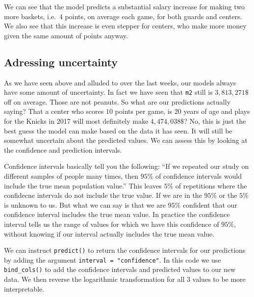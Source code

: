 \documentclass[
]{book}
\begin{document}
We can see that the model predicts a substantial salary increase for making two
more baskets, i.e.~4 points, on average each game, for both guards and centers.
We also see that this increase is even stepper for centers, who make more money
given the same amount of points anyway.

\hypertarget{adressing-uncertainty}{%
\subsection{Adressing uncertainty}\label{adressing-uncertainty}}

As we have seen above and alluded to over the last weeks, our models always
have some amount of uncertainty. In fact we have seen that \texttt{m2} still is
\(3,813,271\$\) off on average. Those are not peanuts. So what are our predictions
actually saying? That a center who scores \(10\) points per game, is 20 years
of age and plays for the Knicks in 2017 will most definitely make \(4,474,038\$\)?
No, this is just the best guess the model can make based on the data it has
seen. It will still be somewhat uncertain about the predicted values.
We can assess this by looking at the confidence and prediction intervals.

Confidence intervals basically tell you the following: ``If we repeated our study
on different samples of people many times, then \(95\%\) of confidence intervals
would include the true mean population value.'' This leaves \(5\%\) of repetitions
where the confidecne intervals do not include the true value. If we are in the
\(95\%\) or the \(5\%\) is unknown to us. But what we can say is that we are \(95\%\)
confident that our confidence interval includes the true mean value.
In practice the confidence interval tells us the range of values for which we
have this confidence of \(95\%\), without knowing if our interval actually
includes the true mean value.

We can instruct \texttt{predict()} to return the confidence intervals for our
predictions by adding the argument \texttt{interval\ =\ "confidence"}. In this code we
use \texttt{bind\_cols()} to add the confidence intervals and predicted values to our
new data. We then reverse the logarithmic transformation for all 3 values to
be more interpretable.
\end{document}
